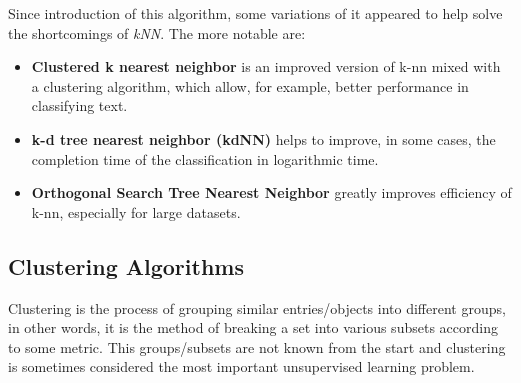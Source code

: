 Since introduction of this algorithm, some variations of it appeared to help solve the shortcomings of \emph{kNN}.\cite{DBLP:journals/corr/abs-1007-0085}
The more notable are:
\begin{itemize}
\item \textbf{Clustered k nearest neighbor} \cite{journals/jcp/ZhouLX09} is an improved version of k-nn mixed with a clustering algorithm, which allow, for example, 
better performance in classifying text.
\item \textbf{k-d tree nearest neighbor (kdNN)} \cite{Sproull1991} helps to improve, in some cases, the completion time of the classification in logarithmic time.
\item \textbf{Orthogonal Search Tree Nearest Neighbor} \cite{955110} greatly improves efficiency of k-nn, especially for large datasets.
\end{itemize}

\subsection{Clustering Algorithms}\label{sec:clust}

Clustering is the process of grouping similar entries/objects into different groups, in other words, it is the method of breaking a set into various subsets according to some
metric. This groups/subsets are not known from the start and clustering is sometimes considered the most important unsupervised learning problem\cite{DBLP:journals/corr/abs-1205-1117}.

